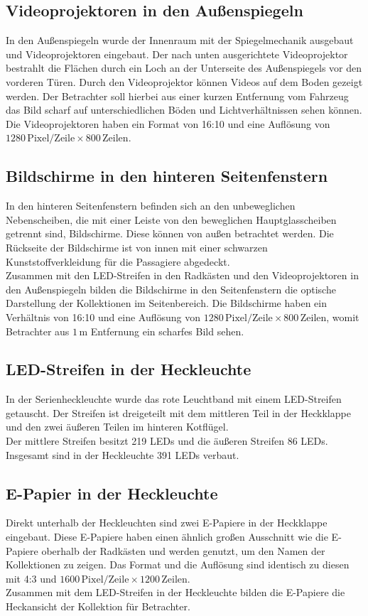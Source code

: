 \subsection{Videoprojektoren in den Außenspiegeln}
In den Außenspiegeln wurde der Innenraum mit der Spiegelmechanik ausgebaut und Videoprojektoren eingebaut. Der nach unten ausgerichtete Videoprojektor bestrahlt die Flächen durch ein Loch an der Unterseite des Außenspiegels vor den vorderen Türen.
Durch den Videoprojektor können Videos auf dem Boden gezeigt werden. Der Betrachter soll hierbei aus einer kurzen Entfernung vom Fahrzeug das Bild scharf auf unterschiedlichen Böden und Lichtverhältnissen sehen können. \\
Die Videoprojektoren haben ein Format von 16:10 und eine Auflösung von $ 1280\,\mathrm{Pixel}/\mathrm{Zeile} \times 800\,\mathrm{Zeilen} $.
\subsection{Bildschirme in den hinteren Seitenfenstern}
In den hinteren Seitenfenstern befinden sich an den unbeweglichen Nebenscheiben, die mit einer Leiste von den beweglichen Hauptglasscheiben getrennt sind, Bildschirme. Diese können von außen betrachtet werden. Die Rückseite der Bildschirme ist von innen mit einer schwarzen Kunststoffverkleidung für die Passagiere abgedeckt.\\
Zusammen mit den LED-Streifen in den Radkästen und den Videoprojektoren in den Außenspiegeln bilden die Bildschirme in den Seitenfenstern die optische Darstellung der Kollektionen im Seitenbereich.
Die Bildschirme haben ein Verhältnis von 16:10 und eine Auflösung von $ 1280\,\mathrm{Pixel}/\mathrm{Zeile} \times 800 \,\mathrm{Zeilen} $, womit Betrachter aus $ 1\,\mathrm{m} $ Entfernung ein scharfes Bild sehen.
\subsection{LED-Streifen in der Heckleuchte}
In der Serienheckleuchte wurde das rote Leuchtband mit einem LED-Streifen getauscht. Der Streifen ist dreigeteilt mit dem mittleren Teil in der Heckklappe und den zwei äußeren Teilen im hinteren Kotflügel. \\
Der mittlere Streifen besitzt 219 LEDs und die äußeren Streifen 86 LEDs. Insgesamt sind in der Heckleuchte 391 LEDs verbaut.
\subsection{E-Papier in der Heckleuchte}
Direkt unterhalb der Heckleuchten sind zwei E-Papiere in der Heckklappe eingebaut.
Diese E-Papiere haben einen ähnlich großen Ausschnitt wie die E-Papiere oberhalb der Radkästen und werden genutzt, um den Namen der Kollektionen zu zeigen. Das Format und die Auflösung sind identisch zu diesen mit 4:3 und $ 1600 \,\mathrm{Pixel}/\mathrm{Zeile} \times 1200\,\mathrm{Zeilen} $.\\
Zusammen mit dem LED-Streifen in der Heckleuchte bilden die E-Papiere die Heckansicht der Kollektion für Betrachter.
